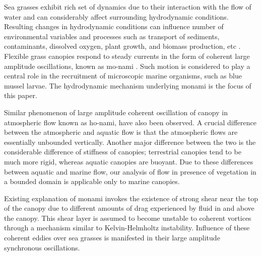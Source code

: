\documentclass[aps,prl,reprint,twocolumn,showpacs,superscriptaddress,10pt]{revtex4-1}  %
\begin{document}
\maketitle

Sea grasses exhibit rich set of dynamics due to their interaction with the flow of water and can considerably affect surrounding hydrodynamic conditions.
Resulting changes in hydrodynamic conditions can influence number of environmental variables and processes such as transport of sediments, contaminants, dissolved oxygen, plant growth, and biomass production, etc \cite{Fonseca87,Nepf99,Nepf2012}. 
Flexible grass canopies respond to steady currents in the form of coherent large amplitude oscillations, known as mo-nami \cite{AckermanOkubo93}. Such motion is considered to play a central role in the recruitment of microscopic marine organisms, such as blue mussel larvae\cite{Grizzle96}.
The hydrodynamic mechanism underlying monami is the focus of this paper. 

Similar phenomenon of large amplitude coherent oscillation of canopy in atmospheric flow known as ho-nami\cite{Inoue56,Raupach96}, have also been observed.
A crucial difference between the atmospheric and aquatic flow is that the atmospheric flows are essentially unbounded vertically\cite{Vivoni98,Nepf00}. 
Another major difference between the two is the considerable difference of stiffness of canopies; terrestrial canopies tend to be much more rigid, whereas aquatic canopies are buoyant\cite{Vivoni98,Ghisal02}.
Due to these differences between aquatic and marine flow, our analysis of flow in presence of vegetation in a bounded domain is applicable only to marine canopies. 

Existing explanation of monami invokes the existence of strong shear near the top of the canopy \cite{Ghisal02,Raupach96} due to different amounts of drag experienced by fluid in and above the canopy. 
This shear layer is assumed to become unstable to coherent vortices through a mechanism similar to Kelvin-Helmholtz instability. 
Influence of these coherent eddies over sea grasses is manifested in their large amplitude synchronous oscillations.
\end{document}
